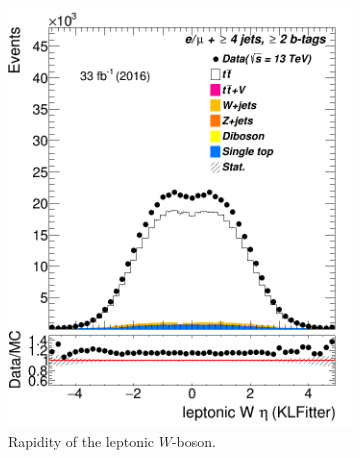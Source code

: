 \begin{figure}
\begin{subfigure}{0.35\textwidth}
		\includegraphics[width=\linewidth]{ControlPlots_emujets_2016_4incl_2incl/klf_Wlep_eta_emujets_2016.png}
		\caption{Rapidity of the leptonic $W$-boson.} \label{fig:38}
	\end{subfigure}
	\medskip	
	\begin{subfigure}{0.35\textwidth}

\end{subfigure}
\end{figure}
